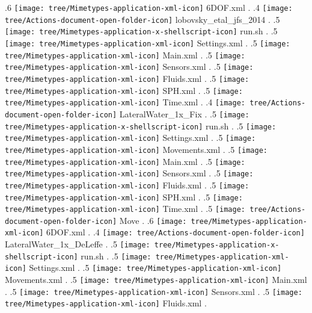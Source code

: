 {.6 { \texttt{[image: tree/Mimetypes-application-xml-icon]} 6DOF.xml }.
.4 { \texttt{[image: tree/Actions-document-open-folder-icon]} lobovsky\_etal\_jfs\_2014 }.
.5 { \texttt{[image: tree/Mimetypes-application-x-shellscript-icon]} run.sh }.
.5 { \texttt{[image: tree/Mimetypes-application-xml-icon]} Settings.xml }.
.5 { \texttt{[image: tree/Mimetypes-application-xml-icon]} Main.xml }.
.5 { \texttt{[image: tree/Mimetypes-application-xml-icon]} Sensors.xml }.
.5 { \texttt{[image: tree/Mimetypes-application-xml-icon]} Fluids.xml }.
.5 { \texttt{[image: tree/Mimetypes-application-xml-icon]} SPH.xml }.
.5 { \texttt{[image: tree/Mimetypes-application-xml-icon]} Time.xml }.
.4 { \texttt{[image: tree/Actions-document-open-folder-icon]} LateralWater\_1x\_Fix }.
.5 { \texttt{[image: tree/Mimetypes-application-x-shellscript-icon]} run.sh }.
.5 { \texttt{[image: tree/Mimetypes-application-xml-icon]} Settings.xml }.
.5 { \texttt{[image: tree/Mimetypes-application-xml-icon]} Movements.xml }.
.5 { \texttt{[image: tree/Mimetypes-application-xml-icon]} Main.xml }.
.5 { \texttt{[image: tree/Mimetypes-application-xml-icon]} Sensors.xml }.
.5 { \texttt{[image: tree/Mimetypes-application-xml-icon]} Fluids.xml }.
.5 { \texttt{[image: tree/Mimetypes-application-xml-icon]} SPH.xml }.
.5 { \texttt{[image: tree/Mimetypes-application-xml-icon]} Time.xml }.
.5 { \texttt{[image: tree/Actions-document-open-folder-icon]} Move }.
.6 { \texttt{[image: tree/Mimetypes-application-xml-icon]} 6DOF.xml }.
.4 { \texttt{[image: tree/Actions-document-open-folder-icon]} LateralWater\_1x\_DeLeffe }.
.5 { \texttt{[image: tree/Mimetypes-application-x-shellscript-icon]} run.sh }.
.5 { \texttt{[image: tree/Mimetypes-application-xml-icon]} Settings.xml }.
.5 { \texttt{[image: tree/Mimetypes-application-xml-icon]} Movements.xml }.
.5 { \texttt{[image: tree/Mimetypes-application-xml-icon]} Main.xml }.
.5 { \texttt{[image: tree/Mimetypes-application-xml-icon]} Sensors.xml }.
.5 { \texttt{[image: tree/Mimetypes-application-xml-icon]} Fluids.xml }.
}
